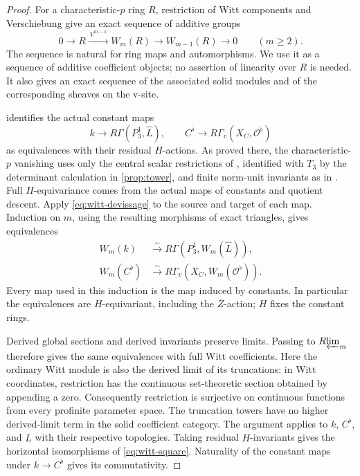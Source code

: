 \documentclass[11pt]{article}
\numberwithin{equation}{section}
\theoremstyle{definition}
\theoremstyle{remark}
\newcommand{\cO}{\mathcal O}
\newcommand{\Rlim}{R\!\varprojlim}
\begin{document}
\begin{proof}
For a characteristic-$p$ ring $R$, restriction of Witt components and
Verschiebung give an exact sequence of additive groups
\begin{equation}\label{eq:witt-devissage}
 0\longrightarrow R\xrightarrow{\ V^{m-1}\ }W_m(R)
   \longrightarrow W_{m-1}(R)\longrightarrow0
 \qquad(m\geq2).
\end{equation}
The sequence is natural for ring maps and automorphisms.  We use it as
a sequence of additive coefficient objects; no assertion of linearity
over $R$ is needed.  It also gives an exact sequence of the associated
solid modules and of the corresponding sheaves on the v-site.

 identifies the actual constant maps
\[
 k\longrightarrow R\Gamma(P_3^1,\widehat L),\qquad
 C^\flat\longrightarrow R\Gamma_v(X_C,\cO^\flat)
\]
as equivalences with their residual $H$-actions.  As proved there,
the characteristic-$p$ vanishing uses only the central scalar
restrictions of \cite[Propositions~3.5.6 and~3.6.9]{BMR2026}, identified
with $T_3$ by the determinant calculation in \cref{prop:tower}, and finite
norm-unit
invariants as in \cite[Lemma~5.2.5]{BMR2026}.  Full $H$-equivariance
comes from the actual maps of constants and quotient descent.
Apply \eqref{eq:witt-devissage} to the source and target of each map.
Induction on $m$, using the resulting morphisms of exact triangles,
gives equivalences
\begin{align*}
 W_m(k)&\xrightarrow{\sim}
       R\Gamma(P_3^1,W_m(\widehat L)),\\
 W_m(C^\flat)&\xrightarrow{\sim}
       R\Gamma_v(X_C,W_m(\cO^\flat)).
\end{align*}
Every map used in this induction is the map induced by constants.
In particular the equivalences are $H$-equivariant, including the
$\overline Z$-action; $H$ fixes the constant rings.

Derived global sections and derived invariants preserve limits.
Passing to $\Rlim_m$ therefore gives the same equivalences with full
Witt coefficients.  Here the ordinary Witt module is also the derived
limit of its truncations: in Witt coordinates, restriction has the
continuous set-theoretic section obtained by appending a zero.
Consequently restriction is surjective on continuous functions from
every profinite parameter space.  The truncation towers have no higher
derived-limit term in the solid coefficient category.  The argument
applies to $k$, $C^\flat$, and $\widehat L$ with their respective
topologies.  Taking residual $H$-invariants gives the horizontal
isomorphisms of \eqref{eq:witt-square}.  Naturality of the constant
maps under $k\to C^\flat$ gives its commutativity.


\end{proof}
\end{document}
